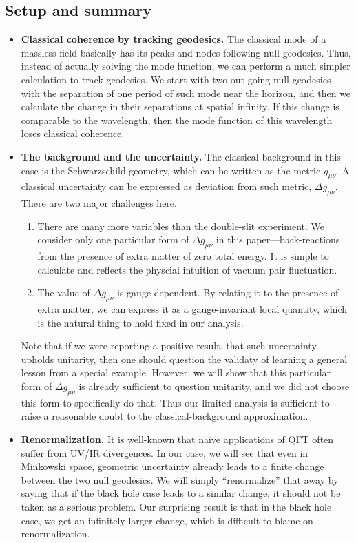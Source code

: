 \documentclass[aps,showpacs,twocolumn,floats,prd,superscriptaddress,nofootinbib]{revtex4-1}
\begin{document}
\subsection{Setup and summary}

\begin{itemize}
\item {\bf Classical coherence by tracking geodesics.} The classical mode of a massless field basically has its peaks and nodes following null geodesics.
Thus, instead of actually solving the mode function, we can perform a much simpler calculation to track geodesics.
We start with two out-going null geodesics with the separation of one period of such mode near the horizon, and then we calculate the change in their separations at spatial infinity.
If this change is comparable to the wavelength, then the mode function of this wavelength loses classical coherence.
\item {\bf The background and the uncertainty.} The classical background in this case is the Schwarzschild geometry, which can be written as the metric $g_{\mu\nu}$. 
A classical uncertainty can be expressed as deviation from such metric, $\Delta g_{\mu\nu}$. 
There are two major challenges here.
\begin{enumerate}
\item There are many more variables than the double-slit experiment. 
We consider only one particular form of $\Delta g_{\mu\nu}$ in this paper---back-reactions from the presence of extra matter of zero total energy. 
It is simple to calculate and reflects the physcial intuition of vacuum pair fluctuation.
\item The value of $\Delta g_{\mu\nu}$ is gauge dependent. 
By relating it to the presence of extra matter, we can express it as a gauge-invariant local quantity, which is the natural thing to hold fixed in our analysis.
\end{enumerate}
Note that if we were reporting a positive result, that such uncertainty upholds unitarity, then one should question the validaty of learning a general lesson from a special example. However, we will show that this particular form of $\Delta g_{\mu\nu}$ is already sufficient to question unitarity, and we did not choose this form to specifically do that. Thus our limited analysis is sufficient to raise a reasonable doubt to the classical-background approximation.
\item {\bf Renormalization.} It is well-known that na\"ive applications of QFT often suffer from UV/IR divergences.
In our case, we will see that even in Minkowski space, geometric uncertainty already leads to a finite change between the two null geodesics.
We will simply ``renormalize'' that away by saying that if the black hole case leads to a similar change, it should not be taken as a serious problem.
Our surprising result is that in the black hole case, we get an infinitely larger change, which is difficult to blame on renormalization.
\end{itemize}
\end{document}
